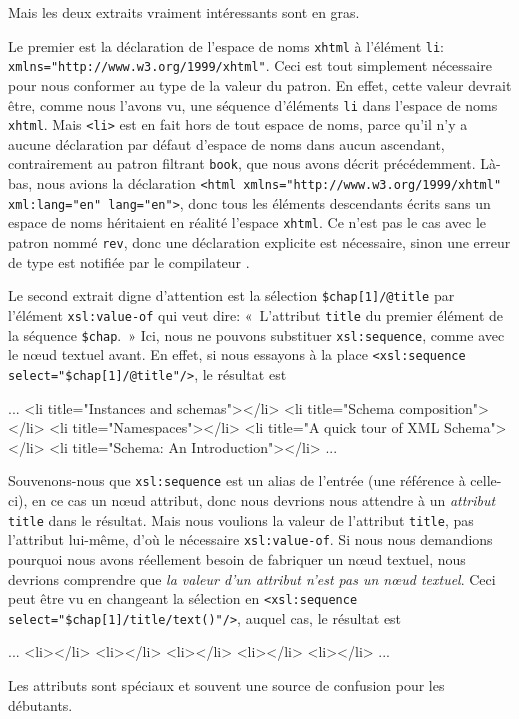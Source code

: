 Mais les deux extraits vraiment intéressants sont en gras.

Le premier est la déclaration de l'espace de noms \texttt{xhtml} à
l'élément \texttt{li}:
\texttt{xmlns="http://www.w3.org/1999/xhtml"}. Ceci est tout
simplement nécessaire pour nous conformer au type de la valeur du
patron. En effet, cette valeur devrait être, comme nous l'avons vu,
une séquence d'éléments \texttt{li} dans l'espace de noms
\texttt{xhtml}. Mais \texttt{<li>} est en fait hors de tout espace de
noms, parce qu'il n'y a aucune déclaration par défaut d'espace de noms
dans aucun ascendant, contrairement au patron filtrant \texttt{book},
que nous avons décrit précédemment. Là-bas, nous avions la déclaration
\texttt{<html xmlns="http://www.w3.org/1999/xhtml" xml:lang="en"
  lang="en">}, donc tous les éléments descendants écrits sans un
espace de noms héritaient en réalité l'espace \texttt{xhtml}. Ce n'est
pas le cas avec le patron nommé \texttt{rev}, donc une déclaration
explicite est nécessaire, sinon une erreur de type est notifiée par le
compilateur \XSLT.

Le second extrait digne d'attention est la sélection
\texttt{\$chap[1]/@title} par l'élément \texttt{xsl:value-of} qui veut
dire: «~L'attribut \texttt{title} du premier élément de la séquence
\texttt{\$chap}.~» Ici, nous ne pouvons substituer
\texttt{xsl:sequence}, comme avec le n{\oe}ud textuel avant. En effet,
si nous essayons à la place \texttt{<xsl:sequence
  select="\$chap[1]/@title"/>}, le résultat est
\begin{sverb}
       ...
         <li title="Instances and schemas"></li>
         <li title="Schema composition"></li>
         <li title="Namespaces"></li>
         <li title="A quick tour of XML Schema"></li>
         <li title="Schema: An Introduction"></li>
       ...
\end{sverb}
Souvenons-nous que \texttt{xsl:sequence} est un alias de l'entrée (une
référence à celle-ci), en ce cas un n{\oe}ud attribut, donc nous
devrions nous attendre à un \emph{attribut} \texttt{title} dans le
résultat. Mais nous voulions la valeur de l'attribut \texttt{title},
pas l'attribut lui-même, d'où le nécessaire \texttt{xsl:value-of}. Si
nous nous demandions pourquoi nous avons réellement besoin de
fabriquer un n{\oe}ud textuel, nous devrions comprendre que \emph{la
  valeur d'un attribut n'est pas un n{\oe}ud textuel}. Ceci peut être
vu en changeant la sélection en \texttt{<xsl:sequence
  select="\$chap[1]/title/text()"/>}, auquel cas, le résultat est
\begin{sverb}
       ...
         <li></li>
         <li></li>
         <li></li>
         <li></li>
         <li></li>
       ...
\end{sverb}
Les attributs sont spéciaux et souvent une source de confusion pour
les débutants.

